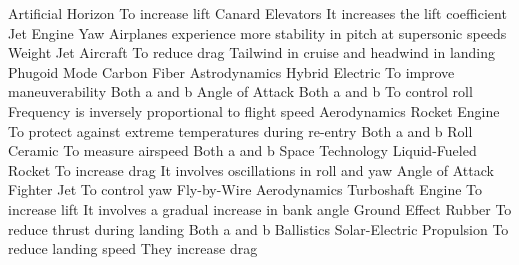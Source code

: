 \answerkey
{} Artificial Horizon
 To increase lift
 Canard
 Elevators
 It increases the lift coefficient
 Jet Engine
 Yaw
 Airplanes experience more stability in pitch at supersonic speeds
 Weight
 Jet Aircraft
 To reduce drag
 Tailwind in cruise and headwind in landing
 Phugoid Mode
 Carbon Fiber
 Astrodynamics
 Hybrid Electric
 To improve maneuverability
 Both a and b
 Angle of Attack
 Both a and b
 To control roll
 Frequency is inversely proportional to flight speed
 Aerodynamics
 Rocket Engine
 To protect against extreme temperatures during re-entry
 Both a and b
 Roll
 Ceramic
 To measure airspeed
 Both a and b
 Space Technology
 Liquid-Fueled Rocket
 To increase drag
 It involves oscillations in roll and yaw
 Angle of Attack
 Fighter Jet
 To control yaw
 Fly-by-Wire
 Aerodynamics
 Turboshaft Engine
 To increase lift
 It involves a gradual increase in bank angle
 Ground Effect
 Rubber
 To reduce thrust during landing
 Both a and b
 Ballistics
 Solar-Electric Propulsion
 To reduce landing speed
 They increase drag
\endanswerkey